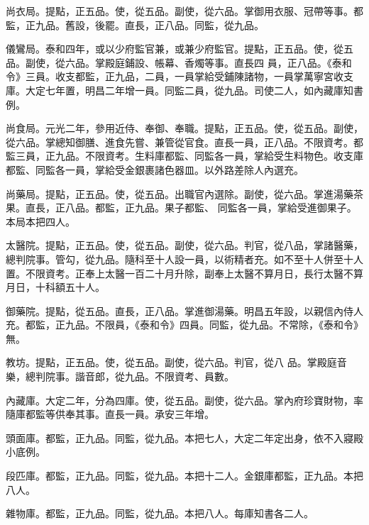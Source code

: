 \begin{pinyinscope}
 尚衣局。提點，正五品。使，從五品。副使，從六品。掌御用衣服、冠帶等事。都監，正九品。舊設，後罷。直長，正八品。同監，從九品。



 儀鸞局。泰和四年，或以少府監官兼，或兼少府監官。提點，正五品。使，從五品。副使，從六品。掌殿庭鋪設、帳幕、香燭等事。直長四
 員，正八品。《泰和令》三員。收支都監，正九品，二員，一員掌給受鋪陳諸物，一員掌萬寧宮收支庫。大定七年置，明昌二年增一員。同監二員，從九品。司使二人，如內藏庫知書例。



 尚食局。元光二年，參用近侍、奉御、奉職。提點，正五品。使，從五品。副使，從六品。掌總知御膳、進食先嘗、兼管從官食。直長一員，正八品。不限資考。都監三員，正九品。不限資考。生料庫都監、同監各一員，掌給受生料物色。收支庫都監、同監各一員，掌給受金銀裹諸色器皿。以外路差除人內選充。



 尚藥局。提點，正五品。使，從五品。出職官內選除。副使，從六品。掌進湯藥茶果。直長，正八品。都監，正九品。果子都監、
 同監各一員，掌給受進御果子。本局本把四人。



 太醫院。提點，正五品。使，從五品。副使，從六品。判官，從八品，掌諸醫藥，總判院事。管勾，從九品。隨科至十人設一員，以術精者充。如不至十人併至十人置。不限資考。正奉上太醫一百二十月升除，副奉上太醫不算月日，長行太醫不算月日，十科額五十人。



 御藥院。提點，從五品。直長，正八品。掌進御湯藥。明昌五年設，以親信內侍人充。都監，正九品。不限員，《泰和令》四員。同監，從九品。不常除，《泰和令》無。



 教坊。提點，正五品。使，從五品。副使，從六品。判官，從八
 品。掌殿庭音樂，總判院事。諧音郎，從九品。不限資考、員數。



 內藏庫。大定二年，分為四庫。使，從五品。副使，從六品。掌內府珍寶財物，率隨庫都監等供奉其事。直長一員。承安三年增。



 頭面庫。都監，正九品。同監，從九品。本把七人，大定二年定出身，依不入寢殿小底例。



 段匹庫。都監，正九品。同監，從九品。本把十二人。金銀庫都監，正九品。本把八人。



 雜物庫。都監，正九品。同監，從九品。本把八人。每庫知書各二人。




\end{pinyinscope}
